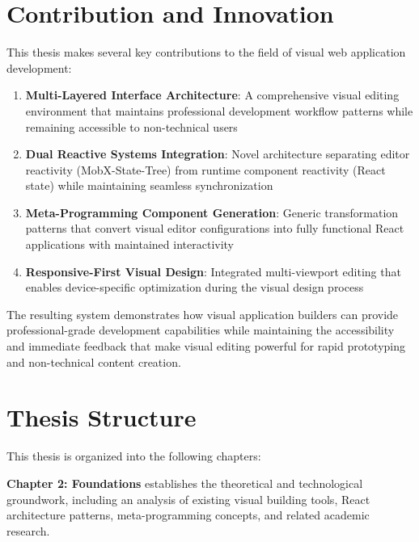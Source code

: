 \documentclass[oneside,11pt]{book}
\begin{document}
\section{Contribution and Innovation}
\label{sec:contribution}

This thesis makes several key contributions to the field of visual web application development:

\begin{enumerate}
    \item \textbf{Multi-Layered Interface Architecture}: A comprehensive visual editing environment that maintains professional development workflow patterns while remaining accessible to non-technical users
    
    \item \textbf{Dual Reactive Systems Integration}: Novel architecture separating editor reactivity (MobX-State-Tree) from runtime component reactivity (React state) while maintaining seamless synchronization
    
    \item \textbf{Meta-Programming Component Generation}: Generic transformation patterns that convert visual editor configurations into fully functional React applications with maintained interactivity
    
    \item \textbf{Responsive-First Visual Design}: Integrated multi-viewport editing that enables device-specific optimization during the visual design process
\end{enumerate}

The resulting system demonstrates how visual application builders can provide professional-grade development capabilities while maintaining the accessibility and immediate feedback that make visual editing powerful for rapid prototyping and non-technical content creation.

\section{Thesis Structure}
\label{sec:structure}

This thesis is organized into the following chapters:

\textbf{Chapter 2: Foundations} establishes the theoretical and technological groundwork, including an analysis of existing visual building tools, React architecture patterns, meta-programming concepts, and related academic research.
\end{document}
